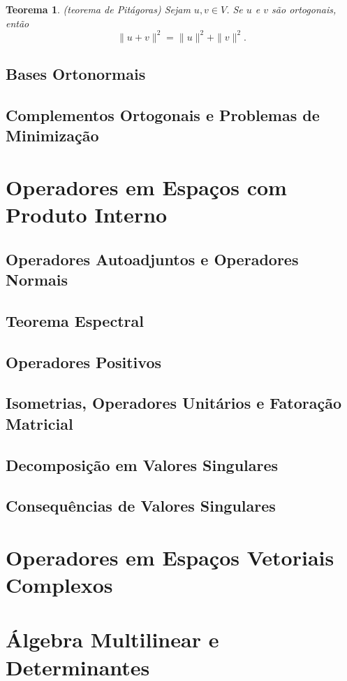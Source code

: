 \documentclass[12pt]{article}
\theoremstyle{plain}
\newtheorem{thm}{Teorema}[section]
\theoremstyle{definition}
\theoremstyle{remark}
\begin{document}
\begin{thm} (teorema de Pitágoras)
    Sejam \(u, v \in V\). Se \(u\) e \(v\) são ortogonais, então
    \[
        \|u + v\|^2 = \|u\|^2 + \|v\|^2.
    \]
\end{thm}

\subsection{Bases Ortonormais}
\subsection{Complementos Ortogonais e Problemas de Minimização}

\section{Operadores em Espaços com Produto Interno}
\subsection{Operadores Autoadjuntos e Operadores Normais}
\subsection{Teorema Espectral}
\subsection{Operadores Positivos}
\subsection{Isometrias, Operadores Unitários e Fatoração Matricial}
\subsection{Decomposição em Valores Singulares}
\subsection{Consequências de Valores Singulares}

\section{Operadores em Espaços Vetoriais Complexos}
\section{Álgebra Multilinear e Determinantes}
\end{document}
